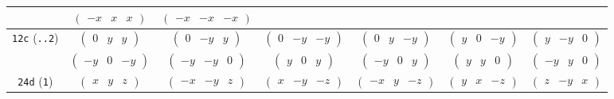 \documentclass[fleqn,9pt,landscape]{jsarticle}
\begin{document}
\begin{center}
\begin{longtable}{ccccccc}
& $ \begin{pmatrix} - x & x & x \end{pmatrix} $ & $ \begin{pmatrix} - x & - x & - x \end{pmatrix} $ & $  $ & $  $ & $  $ & $  $ \\ \hline
{\tt 12c} ({\tt ..2}) & $ \begin{pmatrix} 0 & y & y \end{pmatrix} $ & $ \begin{pmatrix} 0 & - y & y \end{pmatrix} $ & $ \begin{pmatrix} 0 & - y & - y \end{pmatrix} $ & $ \begin{pmatrix} 0 & y & - y \end{pmatrix} $ & $ \begin{pmatrix} y & 0 & - y \end{pmatrix} $ & $ \begin{pmatrix} y & - y & 0 \end{pmatrix} $ \\
& $ \begin{pmatrix} - y & 0 & - y \end{pmatrix} $ & $ \begin{pmatrix} - y & - y & 0 \end{pmatrix} $ & $ \begin{pmatrix} y & 0 & y \end{pmatrix} $ & $ \begin{pmatrix} - y & 0 & y \end{pmatrix} $ & $ \begin{pmatrix} y & y & 0 \end{pmatrix} $ & $ \begin{pmatrix} - y & y & 0 \end{pmatrix} $ \\ \hline
{\tt 24d} ({\tt 1}) & $ \begin{pmatrix} x & y & z \end{pmatrix} $ & $ \begin{pmatrix} - x & - y & z \end{pmatrix} $ & $ \begin{pmatrix} x & - y & - z \end{pmatrix} $ & $ \begin{pmatrix} - x & y & - z \end{pmatrix} $ & $ \begin{pmatrix} y & x & - z \end{pmatrix} $ & $ \begin{pmatrix} z & - y & x \end{pmatrix} $ \\

\end{longtable}
\end{center}
\end{document}
